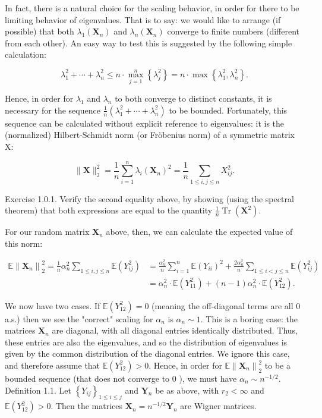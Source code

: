 \documentclass[10pt]{article}
\begin{document}
In fact, there is a natural choice for the scaling behavior, in order for there to be limiting behavior of eigenvalues. That is to say: we would like to arrange (if possible) that both $\lambda_{1}\left(\mathbf{X}_{n}\right)$ and $\lambda_{n}\left(\mathbf{X}_{n}\right)$ converge to finite numbers (different from each other). An easy way to test this is suggested by the following simple calculation:

$$
\lambda_{1}^{2}+\cdots+\lambda_{n}^{2} \leq n \cdot \max _{j=1}^{n}\left\{\lambda_{j}^{2}\right\}=n \cdot \max \left\{\lambda_{1}^{2}, \lambda_{n}^{2}\right\} .
$$

Hence, in order for $\lambda_{1}$ and $\lambda_{n}$ to both converge to distinct constants, it is necessary for the sequence $\frac{1}{n}\left(\lambda_{1}^{2}+\cdots+\lambda_{n}^{2}\right)$ to be bounded. Fortunately, this sequence can be calculated without explicit reference to eigenvalues: it is the (normalized) Hilbert-Schmidt norm (or Fröbenius norm) of a symmetric matrix X:

$$
\|\mathbf{X}\|_{2}^{2}=\frac{1}{n} \sum_{i=1}^{n} \lambda_{i}\left(\mathbf{X}_{n}\right)^{2}=\frac{1}{n} \sum_{1 \leq i, j \leq n} X_{i j}^{2} .
$$

Exercise 1.0.1. Verify the second equality above, by showing (using the spectral theorem) that both expressions are equal to the quantity $\frac{1}{n} \operatorname{Tr}\left(\mathbf{X}^{2}\right)$.

For our random matrix $\mathbf{X}_{n}$ above, then, we can calculate the expected value of this norm:

$$
\begin{aligned}
\mathbb{E}\left\|\mathbf{X}_{n}\right\|_{2}^{2}=\frac{1}{n} \alpha_{n}^{2} \sum_{1 \leq i, j \leq n} \mathbb{E}\left(Y_{i j}^{2}\right) & =\frac{\alpha_{n}^{2}}{n} \sum_{i=1}^{n} \mathbb{E}\left(Y_{i i}\right)^{2}+\frac{2 \alpha_{n}^{2}}{n} \sum_{1 \leq i<j \leq n} \mathbb{E}\left(Y_{i j}^{2}\right) \\
& =\alpha_{n}^{2} \cdot \mathbb{E}\left(Y_{11}^{2}\right)+(n-1) \alpha_{n}^{2} \cdot \mathbb{E}\left(Y_{12}^{2}\right) .
\end{aligned}
$$

We now have two cases. If $\mathbb{E}\left(Y_{12}^{2}\right)=0$ (meaning the off-diagonal terms are all 0 a.s.) then we see the "correct" scaling for $\alpha_{n}$ is $\alpha_{n} \sim 1$. This is a boring case: the matrices $\mathbf{X}_{n}$ are diagonal, with all diagonal entries identically distributed. Thus, these entries are also the eigenvalues, and so the distribution of eigenvalues is given by the common distribution of the diagonal entries. We ignore this case, and therefore assume that $\mathbb{E}\left(Y_{12}^{2}\right)>0$. Hence, in order for $\mathbb{E}\left\|\mathbf{X}_{n}\right\|_{2}^{2}$ to be a bounded sequence (that does not converge to 0 ), we must have $\alpha_{n} \sim n^{-1 / 2}$.\\
Definition 1.1. Let $\left\{Y_{i j}\right\}_{1 \leq i \leq j}$ and $\mathbf{Y}_{n}$ be as above, with $r_{2}<\infty$ and $\mathbb{E}\left(Y_{12}^{2}\right)>0$. Then the matrices $\mathbf{X}_{n}=n^{-1 / 2} \mathbf{Y}_{n}$ are Wigner matrices.
\end{document}
